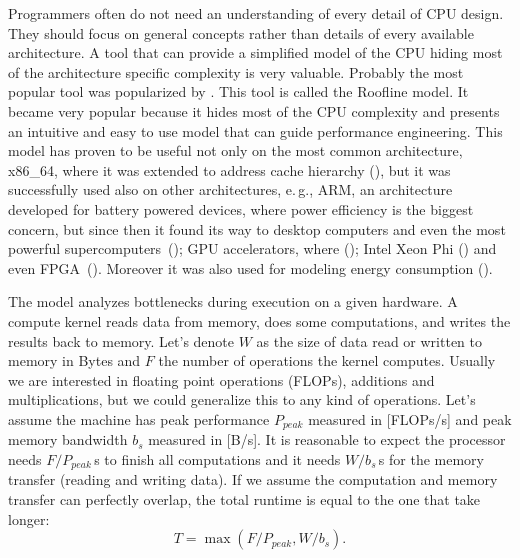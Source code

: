 Programmers often do not need an understanding of every detail of CPU design. They should focus on general concepts rather than details of every available architecture. A tool that can provide a simplified model of the CPU hiding most of the architecture specific complexity is very valuable. Probably the most popular tool was popularized by \cite{williams-2009}. This tool is called the Roofline model.
It became very popular because it hides most of the CPU complexity and presents an intuitive and easy to use model that can guide performance engineering.
{\color{blue} This model has proven to be useful not only on the most common architecture, x86\_64, where it was extended to address cache hierarchy (\cite{MARQUES2020257}), but it was successfully used also on other architectures, e.\,g., ARM, an architecture developed for battery powered devices, where power efficiency is the biggest concern, but since then it found its way to desktop computers and even the most powerful supercomputers~(\cite{9307836}); GPU accelerators, where (\cite{9059264,https://doi.org/10.1002/cpe.5547}); Intel Xeon Phi (\cite{10.1007/978-3-319-32149-3_12}) and even FPGA~(\cite{9307865}). Moreover it was also used for modeling energy consumption (\cite{6569852}).}


The model analyzes bottlenecks during execution on a given hardware.
A compute kernel reads data from memory, does some computations, and writes the results back to memory. Let's denote $W$ as the size of data read or written to memory in Bytes and $F$ the number of operations the kernel computes. Usually we are interested in floating point operations (FLOPs), additions and multiplications, but we could generalize this to any kind of operations.
Let's assume the machine has peak performance $P_{peak}$ measured in [FLOPs/s] and peak memory bandwidth $b_s$ measured in [B/s].
It is reasonable to expect the processor needs $F/P_{peak}$\,s to finish all computations and it needs $W/b_s$\,s for the memory transfer (reading and writing data). If we assume the computation and memory transfer can perfectly overlap, the total runtime is equal to the one that take longer:
\begin{equation}
    T = \max(F/P_{peak}, W/b_s).
\end{equation}

